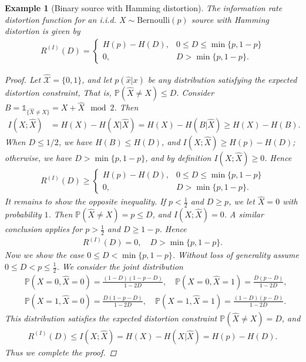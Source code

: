 \documentclass{article}
\numberwithin{equation}{section}
\newcommand{\bbP}{\mathbb{P}}
\renewcommand{\cal}{\mathcal}
\newcommand{\wh}{\widehat}
\theoremstyle{plain}
\newtheorem{example}[theorem]{Example}
\theoremstyle{definition}
\begin{document}
\begin{example}[Binary source with Hamming distortion]
The information rate distortion function for an i.i.d. $X\sim\mathrm{Bernoulli}(p)$ source with Hamming distortion is given by
\begin{align*}
	R^{(I)}(D)=\begin{cases}
		H(p)-H(D), &0\leq D\leq\min\{p,1-p\}\\
		0, &D>\min\{p,1-p\}.
	\end{cases}
\end{align*}
\begin{proof}
Let $\wh{\cal{X}}=\{0,1\}$, and let $p(\wh{x}|x)$ be any distribution satisfying the expected distortion constraint, That is, $\bbP(\wh{X}\neq X)\leq D$. Consider $B=\mathds{1}_{\{\wh{X}\neq X\}}=X+\wh{X}\mod 2$. Then
\begin{align*}
	I(X;\wh{X})&=H(X)-H(X|\wh{X})=H(X)-H(B|\wh{X})\geq H(X)-H(B).
\end{align*}
When $D\leq1/2$, we have $H(B)\leq H(D)$, and $I(X;\wh{X})\geq H(p)-H(D)$; otherwise, we have $D>\min\{p,1-p\}$, and by definition $I(X;\wh{X})\geq 0$. Hence
\begin{align*}
	R^{(I)}(D)\geq\begin{cases}
		H(p)-H(D), &0\leq D\leq\min\{p,1-p\}\\
		0, &D>\min\{p,1-p\}.
	\end{cases}
\end{align*}
It remains to show the opposite inequality. If $p<\frac{1}{2}$ and $D\geq p$, we let $\wh{X}=0$ with probability $1$. Then $\bbP(\wh{X}\neq X)=p\leq D$, and $I(X;\wh{X})=0$. A similar conclusion applies for $p>\frac{1}{2}$ and $D\geq 1-p$. Hence 
\begin{align*}
	R^{(I)}(D)=0,\quad D>\min\{p,1-p\}.
\end{align*}
Now we show the case $0\leq D<\min\{p,1-p\}$. Without loss of generality assume $0\leq D<p\leq\frac{1}{2}$. We consider the joint distribution
\begin{align*}
	&\bbP(X=0,\wh{X}=0)=\frac{(1-D)(1-p-D)}{1-2D},\quad\bbP(X=0,\wh{X}=1)=\frac{D(p-D)}{1-2D},\\
	&\bbP(X=1,\wh{X}=0)=\frac{D(1-p-D)}{1-2D},\quad\bbP(X=1,\wh{X}=1)=\frac{(1-D)(p-D)}{1-2D}.
\end{align*}
This distribution satisfies the expected distortion constraint $\bbP(\wh{X}\neq X)=D$, and
\begin{align*}
	R^{(I)}(D)\leq I(X;\wh{X})=H(X)-H(X|\wh{X})=H(p)-H(D).
\end{align*}
Thus we complete the proof.
\end{proof}
\end{example}
\end{document}
